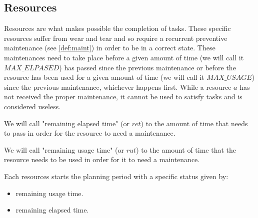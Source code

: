 \documentclass{roadef}
\begin{document}

    \subsection{Resources}
    \label{def:resource}

    Resources are what makes possible the completion of tasks. These specific resources suffer from wear and tear and so require a recurrent preventive maintenance (see \ref{def:maint}) in order to be in a correct state. These maintenances need to take place before a given amount of time (we will call it $MAX\_ELPASED$) has passed since the previous maintenance or before the resource has been used for a given amount of time (we will call it $MAX\_USAGE$) since the previous maintenance, whichever happens first. While a resource $a$ has not received the proper maintenance, it cannot be used to satisfy tasks and is considered useless.

    We will call "remaining elapsed time" (or $ret$) to the amount of time that needs to pass in order for the resource to need a maintenance.

    We will call "remaining usage time" (or $rut$) to the amount of time that the resource needs to be used in order for it to need a maintenance.


    Each resources starts the planning period with a specific status given by:

    \begin{itemize}
        \item remaining usage time.
        \item remaining elapsed time.
    \end{itemize}
\end{document}
